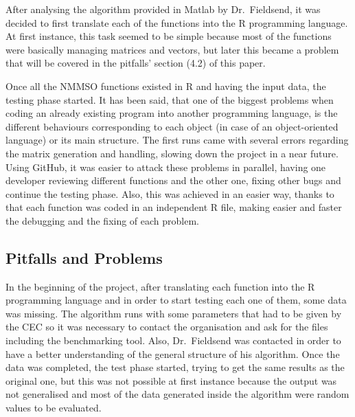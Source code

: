 \documentclass[12pt,a4paper]{article}
\begin{document}
After analysing the algorithm provided in Matlab by Dr.~Fieldsend, it
was decided to first translate each of the functions into the R
programming language. At first instance, this task seemed to be simple
because most of the functions were basically managing matrices and
vectors, but later this became a problem that will be covered in the
pitfalls' section (4.2) of this paper.

Once all the NMMSO functions existed in R and having the input data, the
testing phase started. It has been said, that one of the biggest
problems when coding an already existing program into another
programming language, is the different behaviours corresponding to each
object (in case of an object-oriented language) or its main structure.
The first runs came with several errors regarding the matrix generation
and handling, slowing down the project in a near future. Using GitHub,
it was easier to attack these problems in parallel, having one developer
reviewing different functions and the other one, fixing other bugs and
continue the testing phase. Also, this was achieved in an easier way,
thanks to that each function was coded in an independent R file, making
easier and faster the debugging and the fixing of each problem.

\subsection{Pitfalls and Problems}\label{pitfalls-and-problems}

In the beginning of the project, after translating each function into
the R programming language and in order to start testing each one of
them, some data was missing. The algorithm runs with some parameters
that had to be given by the CEC so it was necessary to contact the
organisation and ask for the files including the benchmarking tool.
Also, Dr.~Fieldsend was contacted in order to have a better
understanding of the general structure of his algorithm. Once the data
was completed, the test phase started, trying to get the same results as
the original one, but this was not possible at first instance because
the output was not generalised and most of the data generated inside the
algorithm were random values to be evaluated.
\end{document}
